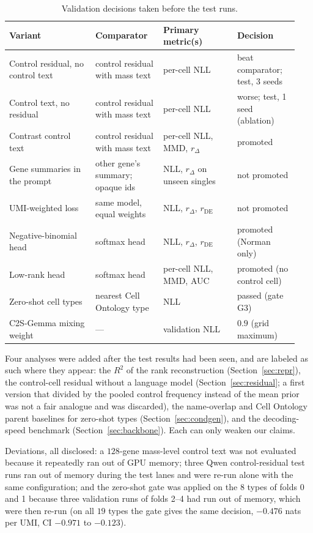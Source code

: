 \begin{table}[!htb]
\centering
\scriptsize
\setlength{\tabcolsep}{3pt}
\begin{tabular}{>{\raggedright\arraybackslash}p{0.28\linewidth}>{\raggedright\arraybackslash}p{0.22\linewidth}>{\raggedright\arraybackslash}p{0.24\linewidth}>{\raggedright\arraybackslash}p{0.20\linewidth}}
\toprule
Variant & Comparator & Primary metric(s) & Decision \\
\midrule
Control residual, no control text & control residual with mass text & per-cell NLL & beat comparator; test, 3 seeds \\
Control text, no residual & control residual with mass text & per-cell NLL & worse; test, 1 seed (ablation) \\
Contrast control text & control residual with mass text & per-cell NLL, MMD, $r_\Delta$ & promoted \\
Gene summaries in the prompt & other gene's summary; opaque ids & NLL, $r_\Delta$ on unseen singles & not promoted \\
UMI-weighted loss & same model, equal weights & NLL, $r_\Delta$, $r_{\mathrm{DE}}$ & not promoted \\
Negative-binomial head & softmax head & NLL, $r_\Delta$, $r_{\mathrm{DE}}$ & promoted (Norman only) \\
Low-rank head & softmax head & per-cell NLL, MMD, AUC & promoted (no control cell) \\
Zero-shot cell types & nearest Cell Ontology type & NLL & passed (gate G3) \\
C2S-Gemma mixing weight & --- & validation NLL & $0.9$ (grid maximum) \\
\bottomrule
\end{tabular}
\caption{Validation decisions taken before the test runs.}
\label{tab:decisions}
\end{table}

Four analyses were added after the test results had been seen, and are labeled as such where they appear: the $R^2$ of the rank reconstruction (Section~\ref{sec:repr}), the control-cell residual without a language model (Section~\ref{sec:residual}; a first version that divided by the pooled control frequency instead of the mean prior was not a fair analogue and was discarded), the name-overlap and Cell Ontology parent baselines for zero-shot types (Section~\ref{sec:condgen}), and the decoding-speed benchmark (Section~\ref{sec:backbone}). Each can only weaken our claims.

Deviations, all disclosed: a $128$-gene mass-level control text was not evaluated because it repeatedly ran out of GPU memory; three Qwen control-residual test runs ran out of memory during the test lanes and were re-run alone with the same configuration; and the zero-shot gate was applied on the $8$ types of folds 0 and 1 because three validation runs of folds 2--4 had run out of memory, which were then re-run (on all $19$ types the gate gives the same decision, $-0.476$ nats per UMI, CI $-0.971$ to $-0.123$).

